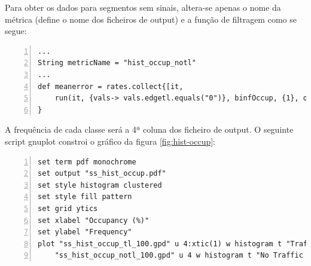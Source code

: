 \documentclass{article}
\begin{document}
Para obter os dados para segmentos sem sinais, altera-se apenas o nome da métrica (define o nome dos ficheiros de output) e a função de filtragem como se segue:

\begin{Verbatim}[numbers=left]
...
String metricName = "hist_occup_notl"
...
def meanerror = rates.collect{[it,
	run(it, {vals-> vals.edgetl.equals("0")}, binfOccup, {1}, outfStats )] 
}
\end{Verbatim}

A frequência de cada classe será a 4ª coluna dos ficheiro de output. O seguinte script gnuplot constroi o gráfico da figura \ref{fig:hist-occup}:

\begin{Verbatim}[numbers=left]
set term pdf monochrome
set output "ss_hist_occup.pdf"
set style histogram clustered
set style fill pattern
set grid ytics
set xlabel "Occupancy (%)"
set ylabel "Frequency"
plot "ss_hist_occup_tl_100.gpd" u 4:xtic(1) w histogram t "Traffic Light",\
	"ss_hist_occup_notl_100.gpd" u 4 w histogram t "No Traffic Light"
\end{Verbatim}
\end{document}
